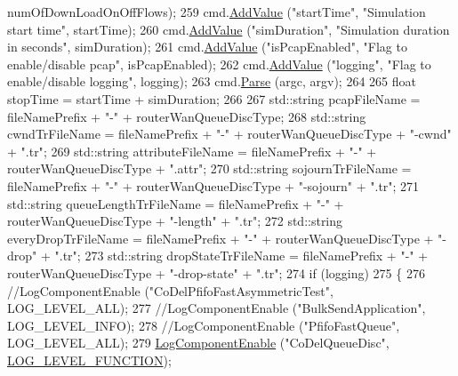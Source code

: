 \begin{DoxyCode}
      numOfDownLoadOnOffFlows);
259   cmd.\hyperlink{classns3_1_1CommandLine_addcfb546c7ad4c8bd0965654d55beb8e}{AddValue} (\textcolor{stringliteral}{"startTime"}, \textcolor{stringliteral}{"Simulation start time"}, startTime);
260   cmd.\hyperlink{classns3_1_1CommandLine_addcfb546c7ad4c8bd0965654d55beb8e}{AddValue} (\textcolor{stringliteral}{"simDuration"}, \textcolor{stringliteral}{"Simulation duration in seconds"}, simDuration);
261   cmd.\hyperlink{classns3_1_1CommandLine_addcfb546c7ad4c8bd0965654d55beb8e}{AddValue} (\textcolor{stringliteral}{"isPcapEnabled"}, \textcolor{stringliteral}{"Flag to enable/disable pcap"}, isPcapEnabled);
262   cmd.\hyperlink{classns3_1_1CommandLine_addcfb546c7ad4c8bd0965654d55beb8e}{AddValue} (\textcolor{stringliteral}{"logging"}, \textcolor{stringliteral}{"Flag to enable/disable logging"}, logging);
263   cmd.\hyperlink{classns3_1_1CommandLine_a5c10b85b3207e5ecb48d907966923156}{Parse} (argc, argv);
264 
265   \textcolor{keywordtype}{float} stopTime = startTime + simDuration;
266 
267   std::string pcapFileName = fileNamePrefix + \textcolor{stringliteral}{"-"} + routerWanQueueDiscType;
268   std::string cwndTrFileName = fileNamePrefix + \textcolor{stringliteral}{"-"} + routerWanQueueDiscType + \textcolor{stringliteral}{"-cwnd"} + \textcolor{stringliteral}{".tr"};
269   std::string attributeFileName = fileNamePrefix + \textcolor{stringliteral}{"-"} + routerWanQueueDiscType + \textcolor{stringliteral}{".attr"};
270   std::string sojournTrFileName = fileNamePrefix + \textcolor{stringliteral}{"-"} + routerWanQueueDiscType + \textcolor{stringliteral}{"-sojourn"} + \textcolor{stringliteral}{".tr"};
271   std::string queueLengthTrFileName = fileNamePrefix + \textcolor{stringliteral}{"-"} + routerWanQueueDiscType + \textcolor{stringliteral}{"-length"} + \textcolor{stringliteral}{".tr"};
272   std::string everyDropTrFileName = fileNamePrefix + \textcolor{stringliteral}{"-"} + routerWanQueueDiscType + \textcolor{stringliteral}{"-drop"} + \textcolor{stringliteral}{".tr"};
273   std::string dropStateTrFileName = fileNamePrefix + \textcolor{stringliteral}{"-"} + routerWanQueueDiscType + \textcolor{stringliteral}{"-drop-state"} + \textcolor{stringliteral}{".tr"};
274   \textcolor{keywordflow}{if} (logging)
275     \{
276       \textcolor{comment}{//LogComponentEnable ("CoDelPfifoFastAsymmetricTest", LOG\_LEVEL\_ALL);}
277       \textcolor{comment}{//LogComponentEnable ("BulkSendApplication", LOG\_LEVEL\_INFO);}
278       \textcolor{comment}{//LogComponentEnable ("PfifoFastQueue", LOG\_LEVEL\_ALL);}
279       \hyperlink{namespacens3_adc4ef4f00bb2f5f4edae67fc3bc27f20}{LogComponentEnable} (\textcolor{stringliteral}{"CoDelQueueDisc"}, \hyperlink{namespacens3_aa6464a4d69551a9cc968e17a65f39bdba53ab278427c09a0c3bc2cd87b09681dc}{LOG\_LEVEL\_FUNCTION});

\end{DoxyCode}
